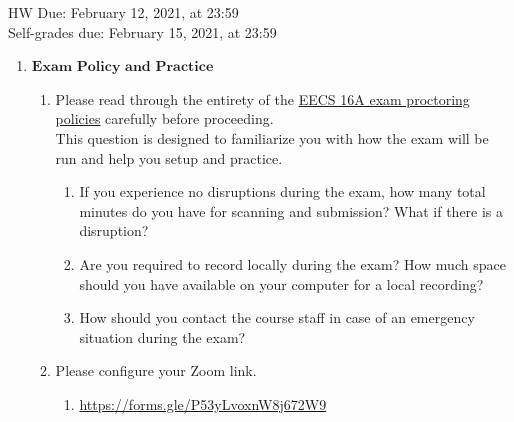 \documentclass[11pt]{article}
\begin{document}
\maketitle
\fontsize{12}{15}\selectfont

\begin{center}
    HW Due: February 12, 2021, at 23:59 \\
    Self-grades due: February 15, 2021, at 23:59
\end{center}

    \begin{enumerate}
        \item $\textbf{Exam Policy and Practice}$
        \begin{enumerate}
            \item Please read through the entirety of the \href{https://docs.google.com/document/d/10pnWwxyZ40nlpbCM4aOYTxXOjc36sIQaMx9m8zyaR8w/edit?usp=sharing}{EECS 16A exam proctoring policies} carefully before proceeding.
            \\
            This question is designed to familiarize you with how the exam will be run and help you setup and practice.
             \begin{enumerate}
               \item If you experience no disruptions during the exam, how many total minutes do you have for scanning and submission? What if there is a disruption?
               \begin{Answer}
               \end{Answer}
               \item Are you required to record locally during the exam? How much space should you have available on your computer for a local recording?
               \begin{Answer}
               \end{Answer}
               \item How should you contact the course staff in case of an emergency situation during the exam?
               \begin{Answer}
               \end{Answer}
             \end{enumerate}
             \item Please configure your Zoom link.
             \begin{enumerate}
               \item \href{https://forms.gle/P53yLvoxnW8j672W9}{https://forms.gle/P53yLvoxnW8j672W9}
               \begin{Answer}

\end{Answer}
\end{enumerate}
\end{enumerate}
\end{enumerate}
\end{document}
